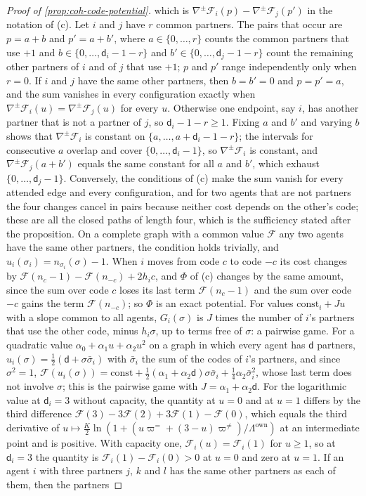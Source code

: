 \begin{proof}[Proof of \cref{prop:coh-code-potential}]
which is $\nabla^{\pm}\mathcal F_i(p)-\nabla^{\pm}\mathcal F_j(p')$ in the notation of (c). Let $i$ and $j$ have $r$ common partners. The pairs that occur are $p=a+b$ and $p'=a+b'$, where $a\in\{0,\dots,r\}$ counts the common partners that use $+1$ and $b\in\{0,\dots,\mathsf d_i-1-r\}$ and $b'\in\{0,\dots,\mathsf d_j-1-r\}$ count the remaining other partners of $i$ and of $j$ that use $+1$; $p$ and $p'$ range independently only when $r=0$. If $i$ and $j$ have the same other partners, then $b=b'=0$ and $p=p'=a$, and the sum vanishes in every configuration exactly when $\nabla^{\pm}\mathcal F_i(u)=\nabla^{\pm}\mathcal F_j(u)$ for every $u$. Otherwise one endpoint, say $i$, has another partner that is not a partner of $j$, so $\mathsf d_i-1-r\ge1$. Fixing $a$ and $b'$ and varying $b$ shows that $\nabla^{\pm}\mathcal F_i$ is constant on $\{a,\dots,a+\mathsf d_i-1-r\}$; the intervals for consecutive $a$ overlap and cover $\{0,\dots,\mathsf d_i-1\}$, so $\nabla^{\pm}\mathcal F_i$ is constant, and $\nabla^{\pm}\mathcal F_j(a+b')$ equals the same constant for all $a$ and $b'$, which exhaust $\{0,\dots,\mathsf d_j-1\}$. Conversely, the conditions of (c) make the sum vanish for every attended edge and every configuration, and for two agents that are not partners the four changes cancel in pairs because neither cost depends on the other's code; these are all the closed paths of length four, which is the sufficiency stated after the proposition. On a complete graph with a common value $\mathcal F$ any two agents have the same other partners, the condition holds trivially, and $u_i(\sigma_i)=n_{\sigma_i}(\sigma)-1$. When $i$ moves from code $c$ to code $-c$ its cost changes by $\mathcal F(n_c-1)-\mathcal F(n_{-c})+2h_ic$, and $\Phi$ of (c) changes by the same amount, since the sum over code $c$ loses its last term $\mathcal F(n_c-1)$ and the sum over code $-c$ gains the term $\mathcal F(n_{-c})$; so $\Phi$ is an exact potential. For values $\mathrm{const}_i+Ju$ with a slope common to all agents, $G_i(\sigma)$ is $J$ times the number of $i$'s partners that use the other code, minus $h_i\sigma$, up to terms free of $\sigma$: a pairwise game. For a quadratic value $\alpha_0+\alpha_1u+\alpha_2u^2$ on a graph in which every agent has $\mathsf d$ partners, $u_i(\sigma)=\frac12(\mathsf d+\sigma\bar\sigma_i)$ with $\bar\sigma_i$ the sum of the codes of $i$'s partners, and since $\sigma^2=1$, $\mathcal F(u_i(\sigma))=\mathrm{const}+\frac12(\alpha_1+\alpha_2\mathsf d)\sigma\bar\sigma_i+\frac14\alpha_2\bar\sigma_i^2$, whose last term does not involve $\sigma$; this is the pairwise game with $J=\alpha_1+\alpha_2\mathsf d$. For the logarithmic value at $\mathsf d_i=3$ without capacity, the quantity at $u=0$ and at $u=1$ differs by the third difference $\mathcal F(3)-3\mathcal F(2)+3\mathcal F(1)-\mathcal F(0)$, which equals the third derivative of $u\mapsto\frac K2\ln(1+(u\varpi^{=}+(3-u)\varpi^{\neq})/\Lambda^{\mathrm{own}})$ at an intermediate point and is positive. With capacity one, $\mathcal F_i(u)=\mathcal F_i(1)$ for $u\ge1$, so at $\mathsf d_i=3$ the quantity is $\mathcal F_i(1)-\mathcal F_i(0)>0$ at $u=0$ and zero at $u=1$. If an agent $i$ with three partners $j$, $k$ and $l$ has the same other partners as each of them, then the partners 
\end{proof}
